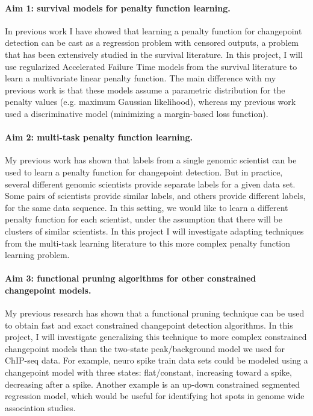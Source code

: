 \documentclass{article}
\begin{document}
\paragraph{Aim 1: survival models for penalty function learning.} In
previous work I have showed that learning a penalty function for
changepoint detection can be cast as a regression problem with
censored outputs, a problem that has been extensively studied in the
survival literature. In this project, I will use regularized Accelerated Failure
Time models from the survival literature to learn a multivariate
linear penalty function. The main difference with my previous work is
that these models assume a parametric distribution for the penalty values
(e.g. maximum Gaussian likelihood), whereas my previous
work used a discriminative model (minimizing a margin-based loss
function).

\paragraph{Aim 2: multi-task penalty function learning.} My previous
work has shown that labels from a single genomic scientist can be used
to learn a penalty function for changepoint detection. But in
practice, several different genomic scientists provide separate
labels for a given data set. Some pairs of scientists provide similar
labels, and others provide different labels, for the same data
sequence. In this setting, we would like to learn a different penalty
function for each scientist, under the assumption that there will be
clusters of similar scientists. In this project I will investigate
adapting techniques from the multi-task learning literature to this
more complex penalty function learning problem.


\paragraph{Aim 3: functional pruning algorithms for other constrained
  changepoint models.} My previous research has shown that a
functional pruning technique can be used to obtain fast and exact
constrained changepoint detection algorithms. In this project, I will
investigate generalizing this technique to more complex constrained
changepoint models than the two-state peak/background model we used
for ChIP-seq data. For example, neuro spike train data sets could be
modeled using a changepoint model with three states: flat/constant,
increasing toward a spike, decreasing after a spike.  Another example
is an up-down constrained segmented regression model, which would be
useful for identifying hot spots in genome wide association studies.
\end{document}
